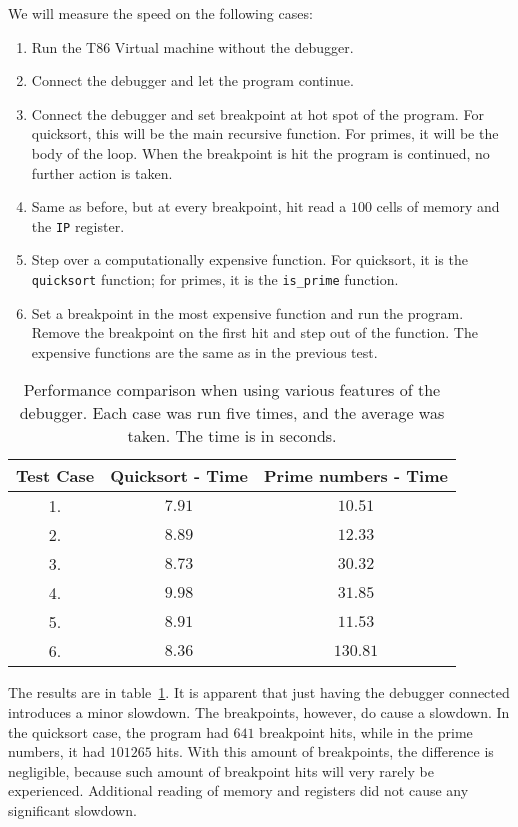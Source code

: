 
We will measure the speed on the following cases:
\begin{enumerate}
    \item Run the T86 Virtual machine without the debugger.
    \item Connect the debugger and let the program continue.
    \item Connect the debugger and set breakpoint at hot spot of the program.
        For quicksort, this will be the main recursive function. For primes, it
        will be the body of the loop. When the breakpoint is hit the program is
        continued, no further action is taken.
    \item Same as before, but at every breakpoint, hit read a $100$ cells of
        memory and the \texttt{IP} register.
    \item  Step over a computationally expensive function. For quicksort, it is
        the \texttt{quicksort} function; for primes, it is the \verb|is_prime|
        function.
    \item Set a breakpoint in the most expensive function and run the program.
        Remove the breakpoint on the first hit and step out of the function.
        The expensive functions are the same as in the previous test.
\end{enumerate}

\begin{table}[]
\centering
\begin{tabular}{||c c c||}
\hline
Test Case & Quicksort - Time & Prime numbers - Time \\
\hline\hline
1. & $7.91$            & $10.51$  \\
2. & $8.89$            & $12.33$  \\
3. & $8.73$            & $30.32$  \\
4. & $9.98$             & $31.85$  \\
5. & $8.91$            & $11.53$  \\
6. & $8.36$            & $130.81$ \\
\hline
\end{tabular}
\caption{Performance comparison when using various features of the debugger.
    Each case was run five times, and the average was taken. The time is in
    seconds.}
\label{table:benchmark}
\end{table}

The results are in table~\ref{table:benchmark}. It is apparent that just having
the debugger connected introduces a minor slowdown. The breakpoints, however,
do cause a slowdown. In the quicksort case, the program had $641$ breakpoint
hits, while in the prime numbers, it had $101265$ hits. With this amount  of
breakpoints, the difference is negligible, because such amount of breakpoint
hits will very rarely be experienced. Additional reading of memory and
registers did not cause any significant slowdown.

